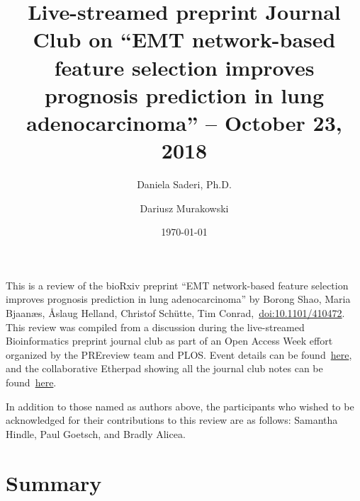 \documentclass[10pt]{article}
\renewenvironment{abstract}
  {{\bfseries\noindent{\abstractname}\par\nobreak}\footnotesize}
  {\bigskip}
\begin{document}
\title{Live-streamed preprint Journal Club on ``EMT network-based feature
selection improves prognosis prediction in lung adenocarcinoma'' --
October 23, 2018}



\author[1]{Daniela Saderi, Ph.D.}%
\author[2]{Dariusz Murakowski}%
%
%


\vspace{-1em}



  \date{\today}


\begingroup
\let\center\flushleft
\let\endcenter\endflushleft
\maketitle
\endgroup





\begin{abstract}
This is a review of the bioRxiv preprint ``EMT network-based feature
selection improves prognosis prediction in lung adenocarcinoma'' by
Borong Shao, Maria Bjaanæs, Åslaug Helland, Christof Schütte, Tim
Conrad,~\href{https://doi.org/10.1101/410472}{doi:10.1101/410472}. This
review was compiled from a discussion during the live-streamed
Bioinformatics preprint journal club as part of an Open Access Week
effort organized by the PREreview team and PLOS. Event details can be
found~\href{https://prereview.org/users/153686/articles/325778-prereview-plos-open-access-week-preprint-journal-club-information}{here},
and the collaborative Etherpad showing all the journal club notes can be
found~\href{https://etherpad.net/p/BioinformaticsLiveStreamedPREJC}{here}.

\par\null

In addition to those named as authors above, the participants who wished
to be acknowledged for their contributions to this review are as
follows: Samantha Hindle, Paul Goetsch, and Bradly Alicea.%
\end{abstract}%




\section*{Summary}

{\label{742313}}
\end{document}
